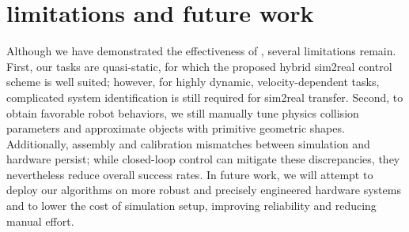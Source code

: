 \section{limitations and future work}
 Although we have demonstrated the effectiveness of \ourshort, several limitations remain. First, our tasks are quasi-static, for which the proposed hybrid sim2real control scheme is well suited; however, for highly dynamic, velocity-dependent tasks, complicated system identification is still required for sim2real transfer. Second, to obtain favorable robot behaviors, we still manually tune physics collision parameters and approximate objects with primitive geometric shapes. Additionally, assembly and calibration mismatches between simulation and hardware persist; while closed-loop control can mitigate these discrepancies, they nevertheless reduce overall success rates. In future work, we will attempt to deploy our algorithms on more robust and precisely engineered hardware systems and to lower the cost of simulation setup, improving reliability and reducing manual effort.